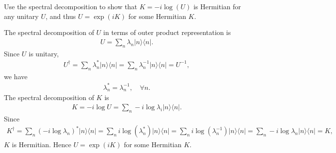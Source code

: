 \documentclass[en]{sol-man}
\begin{document}
\begin{exe}
    Use the spectral decomposition to show that $K=-i\log(U)$ is Hermitian for any unitary $U$, and thus $U=\exp(iK)$ for some Hermitian $K$.
\end{exe}
\begin{pf}
    The spectral decomposition of $U$ in terms of outer product representation is
    \begin{align}
        U=\sum_n\lambda_n\lvert n\rangle\langle n\rvert.
    \end{align}
    Since $U$ is unitary,
    \begin{align}
        U^{\dagger}=\sum_n\lambda_n^*\lvert n\rangle\langle n\rvert=\sum_n\lambda_n^{-1}\lvert n\rangle\langle n\rvert=U^{-1},
    \end{align}
    we have
    \begin{align}
        \lambda_n^*=\lambda_n^{-1},\quad\forall n.
    \end{align}
    The spectral decomposition of $K$ is
    \begin{align}
        K=-i\log U=\sum_n-i\log\lambda_i\lvert n\rangle\langle n\rvert.
    \end{align}
    Since
    \begin{align}
        K^{\dagger}=\sum_n(-i\log\lambda_n)^*\lvert n\rangle\langle n\rvert=\sum_ni\log(\lambda_n^*)\lvert n\rangle\langle n\rvert=\sum_ni\log(\lambda_n^{-1})\lvert n\rangle\langle n\rvert=\sum_n-i\log\lambda_n\lvert n\rangle\langle n\rvert=K,
    \end{align}
    $K$ is Hermitian. Hence $U=\exp(iK)$ for some Hermitian $K$.
\end{pf}
\end{document}
